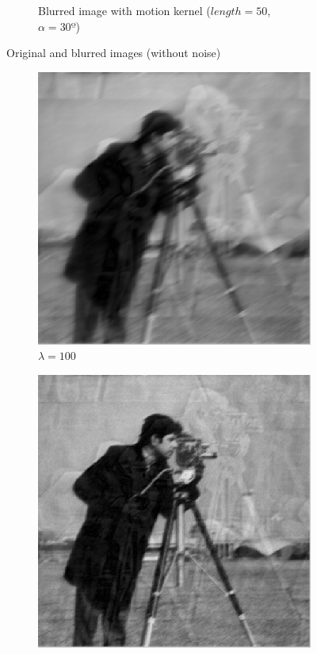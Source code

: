 \documentclass[a4paper, 10pt, conference] {article}
\begin{document}
\begin{figure}[H]
\begin{subfigure}{0.49\textwidth}
		\caption{Blurred image with motion kernel ($length = 50$, $\alpha = 30º$)}
	\end{subfigure}
	\caption{Original and blurred images (without noise)}
	\label{noNoiseOriginal2}
\end{figure}

\begin{figure}[H]
	\centering
	\begin{subfigure}{0.49\textwidth} 
		\centering						
		\includegraphics[scale=0.48]{motion/no_noise/lam100.PNG}
		\caption{$\lambda = 100$}
	\end{subfigure}
	\begin{subfigure}{0.49\textwidth} 
		\centering						
		\includegraphics[scale=0.48]{motion/no_noise/lam1000.PNG}

\end{subfigure}
\end{figure}
\end{document}
